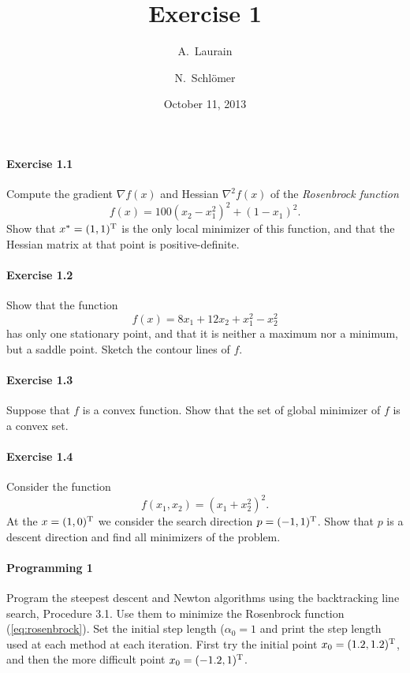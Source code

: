 
\title{Exercise 1}
\subject{Optimization}
\date{October 11, 2013}
\author{A.~Laurain\and N.~Schl\"omer}
\usepackage{amsmath}
\newcommand\tp{\ensuremath{\text{\upshape T}}}


\maketitle

\paragraph{Exercise 1.1}
Compute  the gradient $\nabla f(x)$ and Hessian $\nabla^2f(x)$ of the
\emph{Rosenbrock function}
\begin{equation}\label{eq:rosenbrock}
  f(x) = 100(x_2-x_1^2)^2 + (1-x_1)^2.
\end{equation}
Show that $x^*=(1,1)^\tp$ is the only local minimizer of this function, and
that the Hessian matrix at that point is positive-definite.

\paragraph{Exercise 1.2}
Show that the function
\[
  f(x) = 8x_1 + 12x_2 + x_1^2 - x_2^2
\]
has only one stationary point, and that it is neither a maximum nor a minimum,
but a saddle point. Sketch the contour lines of $f$.

\paragraph{Exercise 1.3}
Suppose that $f$ is a convex function. Show that the set of global minimizer
of $f$ is a convex set.

\paragraph{Exercise 1.4}
Consider the function
\[
  f(x_1, x_2) = (x_1+x_2^2)^2.
\]
At the $x=(1,0)^\tp$ we consider the search direction $p=(-1,1)^\tp$. Show
that $p$ is a descent direction and find all minimizers of the problem.

\paragraph{Programming 1}
Program the steepest descent and Newton algorithms using the backtracking line
search, Procedure 3.1. Use them to minimize the Rosenbrock function
(\ref{eq:rosenbrock}). Set the initial step length ($\alpha_0=1$ and print the
step length used at each method at each iteration. First try the initial point
$x_0=(1.2, 1.2)^\tp$, and then the more difficult point $x_0=(-1.2, 1)^\tp$.



